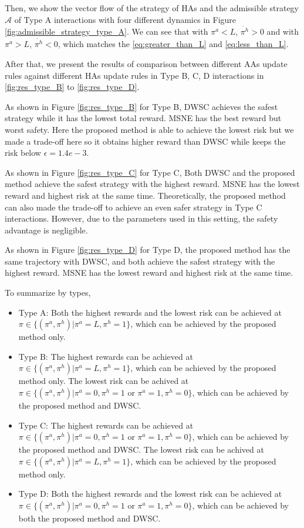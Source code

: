 \documentclass[letterpaper]{article} %
\begin{document}
Then, we show the vector flow of the strategy of HAs and the admissible strategy $\mathcal{A}$ of Type A interactions with four different dynamics in Figure \ref{fig:admissible_strategy_type_A}. We can see that with $\pi^a<L$, $\dot{\pi^h}>0$ and with $\pi^a>L$, $\dot{\pi^h}<0$, which matches the  \eqref{eq:greater_than_L} and \eqref{eq:less_than_L}.

After that, we present the results of comparison between different AAs update rules against different HAs update rules in Type B, C, D interactions in \ref{fig:res_type_B} to 
\ref{fig:res_type_D}. 

As shown in Figure \ref{fig:res_type_B} 
for Type B, DWSC achieves the safest strategy while it has the lowest total reward. MSNE has the best reward but worst safety. Here the proposed method is able to achieve the lowest risk but we made a trade-off here so it obtains higher reward than DWSC while keeps the risk below $\epsilon=1.4e-3$.

As shown in Figure \ref{fig:res_type_C}
for Type C, Both DWSC and the proposed method achieve the safest strategy with the highest reward. MSNE has the lowest reward and highest risk at the same time. Theoretically, the proposed method can also made the trade-off to achieve an even safer strategy in Type C interactions. However, due to the parameters used in this setting, the safety advantage is negligible.

As shown in Figure \ref{fig:res_type_D}
for Type D, the proposed method has the same trajectory with DWSC, and both achieve the safest strategy with the highest reward. MSNE has the lowest reward and highest risk at the same time.

To summarize by types, 
\begin{itemize}
    \item Type A: Both the highest rewards and the lowest risk can be achieved at $\pi\in\{(\pi^a,\pi^h)|\pi^a=L,\pi^h=1\}$, which can be achieved by the proposed method only.  
    \item Type B: The highest rewards can be achieved at $\pi\in\{(\pi^a,\pi^h)|\pi^a=L,\pi^h=1\}$, which can be achieved by the proposed method only. The lowest risk can be achived at $\pi\in\{(\pi^a,\pi^h)|\pi^a=0,\pi^h=1 \text{ or } \pi^a=1,\pi^h=0\}$, which can be achieved by the proposed method and DWSC.
    \item Type C: The highest rewards can be achieved at $\pi\in\{(\pi^a,\pi^h)|\pi^a=0,\pi^h=1 \text{ or } \pi^a=1,\pi^h=0\}$, which can be achieved by the proposed method and DWSC. The lowest risk can be achived at $\pi\in\{(\pi^a,\pi^h)|\pi^a=L,\pi^h=1\}$, which can be achieved by the proposed method only.
    \item Type D: Both the highest rewards and the lowest risk can be achieved at $\pi\in\{(\pi^a,\pi^h)|\pi^a=0,\pi^h=1 \text{ or } \pi^a=1,\pi^h=0\}$, which can be achieved by both the proposed method and DWSC.
\end{itemize}
\end{document}
